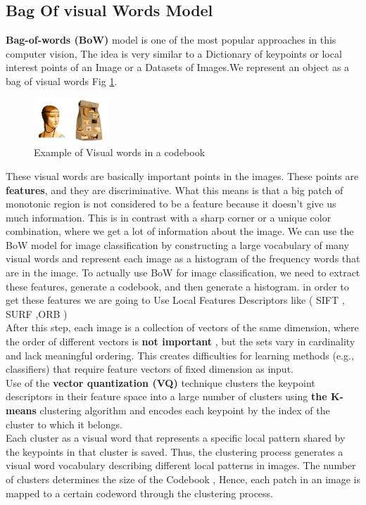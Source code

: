 \subsection{  Bag Of visual Words Model}

 \textbf{Bag-of-words (BoW) } model is one of the most popular approaches in this computer vision, The idea is very similar to a Dictionary of keypoints or local interest points of an Image or a Datasets of Images.We represent an object as a bag of visual words Fig \ref{fig:coodbook}.
\begin{figure}
\includegraphics[width=0.25\textwidth]{img/codebook.jpg}
\caption{Example of Visual words in a codebook}
\label{fig:coodbook}
\end{figure}
These visual words are basically important points in the images. These points are \textbf{features}, and they are discriminative. What this means is that a big patch of monotonic region is not considered to be a feature because it doesn’t give us much information. This is in contrast with a sharp corner or a unique color combination, where we get a lot of information about the image. We can use the BoW model for image classification by constructing a large vocabulary of many visual words and represent each image as a histogram of the frequency words that are in the image. To actually use BoW for image classification, we need to extract these features, generate a codebook, and then generate a histogram. in order to get these features we are going to Use Local Features Descriptors like ( SIFT , SURF ,ORB )\\
After this step, each image is a collection of vectors of the same dimension, where the order of different vectors is\textbf{ not important} , but the sets vary in cardinality and lack meaningful ordering. This creates difficulties for learning methods (e.g., classifiers) that require feature vectors of fixed dimension as input.\\ Use of the \textbf{vector quantization (VQ)} technique clusters the keypoint descriptors in their feature space into a large number of clusters using \textbf{the K-means } clustering algorithm and encodes each keypoint by the index of the cluster to which it belongs.\\ Each cluster as a visual word that represents a specific local pattern shared by the keypoints in that cluster is saved. Thus, the clustering process generates a visual word vocabulary describing different local patterns in images. The number of clusters determines the size of the Codebook , Hence, each patch in an image is mapped to a certain codeword through the clustering process.

